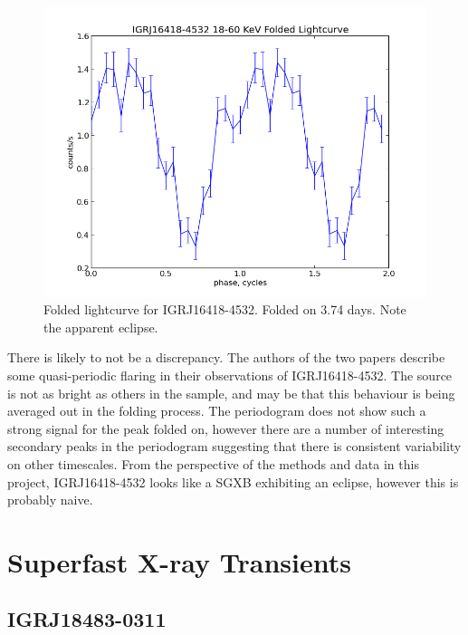 \begin{figure}[h!]
\centering
\includegraphics[width=130mm]{gfx/Fig15.png}
\caption{Folded lightcurve for IGRJ16418-4532. Folded on 3.74 days. Note the apparent eclipse.}
\label{Figure 15}
\end{figure} 

There is likely to not be a discrepancy. The authors of the two papers describe some quasi-periodic flaring in their observations of IGRJ16418-4532. The source is not as bright as others in the sample, and may be that this behaviour is being averaged out in the folding process. The periodogram does not show such a strong signal for the peak folded on, however there are a number of interesting secondary peaks in the periodogram suggesting that there is consistent variability on other timescales. From the perspective of the methods and data in this project, IGRJ16418-4532 looks like a SGXB exhibiting an eclipse, however this is probably naive. 

\clearpage
\section{Superfast X-ray Transients}

\subsection{IGRJ18483-0311}

